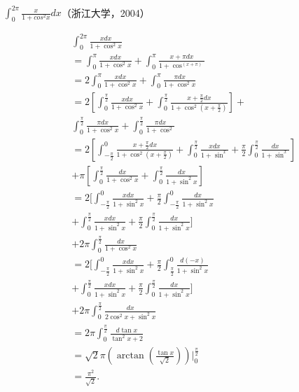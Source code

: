  \begin{example}
  \hfill\\
  $\int_0^{2\pi}\frac x{1+cos^2x}dx$（浙江大学，2004）
  
  
  \begin{equation}
  \begin{aligned}
    &\int_0^{2\pi }\frac{x dx}{1+\cos^2x}\\&=\int_0^{\pi}\frac{x dx}{1+\cos^2x}+\int_0^{\pi}\frac{x+\pi dx}{1+\cos^(x+\pi)}\\
    &=2\int_0^{\pi}\frac{xdx}{1+\cos^2x}+\int_0^{\pi}\frac{\pi dx}{1+\cos^2x}\\
    &=2[\int_0^{\frac{\pi}{2}}\frac{xdx}{1+\cos^2x}+\int_0^{\frac{\pi}{2}}\frac{x+\frac{\pi}{2}dx}{1+\cos^2(x+\frac{\pi}{2})}]+\\
    &\int_0^{\frac{\pi}{2}}\frac{\pi dx}{1+\cos^2x}+\int_0^{\frac{\pi}{2}}\frac{\pi dx}{1+\cos^2}\\
    &=2[\int_{-\frac{\pi}{2}}^0\frac{x+\frac{\pi}2dx}{1+\cos^2(x+\frac{\pi}{2})}+\int_0^{\frac{\pi}{2}}\frac{xdx}{1+\sin^x}+\frac{\pi}{2}\int_0^{\frac{\pi}{2}}\frac{dx}{1+\sin^x}]\\
    &+\pi[\int_0^{\frac{\pi}{2}}\frac{dx}{1+\cos^2x}+\int_0^{\frac{\pi}{2}}\frac{dx}{1+\sin^2x}]\\
    &=2[\int_{-\frac{\pi}{2}}^0\frac{xdx}{1+\sin^2x}+\frac{\pi}{2}\int_{-\frac{\pi}{2}}^0\frac{dx}{1+\sin^2x}\\
    &+\int_0^{\frac{\pi}{2}}\frac{xdx}{1+\sin^2x}+\frac{\pi}{2}\int_0^{\frac{\pi}{2}}\frac{dx}{1+\sin^2x}]\\
    &+2\pi\int_0^{\frac{\pi}{2}}\frac{dx}{1+\cos^2x}\\
    &=2[\int_{-\frac{\pi}{2}}^0\frac{xdx}{1+\sin^2x}+\frac{\pi}{2}\int_{\frac{\pi}{2}}^0\frac{d(-x)}{1+\sin^2x}\\
    &+\int_0^{\frac{\pi}{2}}\frac{xdx}{1+\sin^2x}+\frac{\pi}{2}\int_0^{\frac{\pi}{2}}\frac{dx}{1+\sin^2x}]\\
    &+2\pi\int_0^{\frac{\pi}{2}}\frac{dx}{2\cos^2x+\sin^2x}\\
    &=2\pi\int_0^{\frac{\pi}{2}}\frac{d\tan x}{\tan^2x+2}\\
    &=\sqrt{2}\pi(\arctan(\frac{\tan x}{\sqrt{2}}))|_0^{\frac{\pi}{2}}\\
    &=\frac{\pi^2}{\sqrt{2}}.\\
  \end{aligned}
  \end{equation}
  \end{example}
